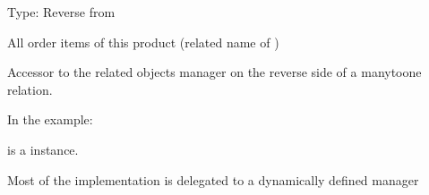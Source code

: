 \documentclass[letterpaper,10pt,russian]{sphinxmanual}
\begin{document}
\begin{fulllineitems}
\begin{fulllineitems}
\end{fulllineitems}


\begin{fulllineitems}
\label{\detokenize{myapp:polls.models.Product.objects}}
\pysigstartsignatures
\pysigline
{}
\pysigstopsignatures
\end{fulllineitems}


\begin{fulllineitems}
\label{\detokenize{myapp:polls.models.Product.orderitem_set}}
\pysigstartsignatures
\pysigline
{}
\pysigstopsignatures
\sphinxAtStartPar
Type: Reverse  from {\hyperref[\detokenize{myapp:polls.models.OrderItem}]{}}

\sphinxAtStartPar
All order items of this product (related name of {\hyperref[\detokenize{myapp:polls.models.OrderItem.product}]{}})

\sphinxAtStartPar
Accessor to the related objects manager on the reverse side of a
many\sphinxhyphen{}to\sphinxhyphen{}one relation.

\sphinxAtStartPar
In the example:

\begin{sphinxVerbatim}[commandchars=\\\{\}]
       
\end{sphinxVerbatim}

\sphinxAtStartPar
{} is a  instance.

\sphinxAtStartPar
Most of the implementation is delegated to a dynamically defined manager

\end{fulllineitems}


\end{fulllineitems}
\end{document}
